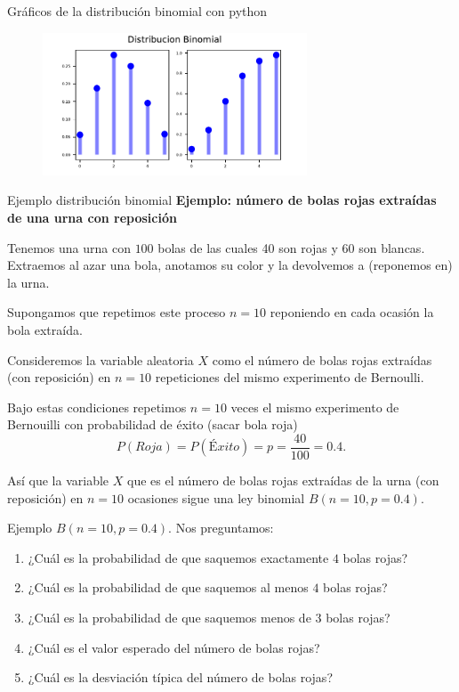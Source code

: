 \documentclass[
  ignorenonframetext,
  aspectratio=169]{beamer}
\providecommand{\tightlist}{%
  \setlength{\itemsep}{0pt}\setlength{\parskip}{0pt}}\usepackage{longtable,booktabs,array}
\begin{document}
\begin{frame}{Gráficos de la distribución binomial con python}
\protect\hypertarget{gruxe1ficos-de-la-distribuciuxf3n-binomial-con-python-2}{}
\begin{figure}

{\centering \includegraphics[width=0.7\textwidth,height=\textheight]{Tema_3_1_Notables_files/figure-beamer/dibu_python2-1.pdf}

}

\end{figure}
\end{frame}

\begin{frame}{Ejemplo distribución binomial}
\protect\hypertarget{ejemplo-distribuciuxf3n-binomial}{}
\textbf{Ejemplo: número de bolas rojas extraídas de una urna con
reposición}

Tenemos una urna con \(100\) bolas de las cuales 40 son rojas y 60 son
blancas. Extraemos al azar una bola, anotamos su color y la devolvemos a
(reponemos en) la urna.

Supongamos que repetimos este proceso \(n=10\) reponiendo en cada
ocasión la bola extraída.

Consideremos la variable aleatoria \(X\) como el número de bolas rojas
extraídas (con reposición) en \(n=10\) repeticiones del mismo
experimento de Bernoulli.

Bajo estas condiciones repetimos \(n=10\) veces el mismo experimento de
Bernouilli con probabilidad de éxito (sacar bola roja)
\[P(Roja)=P(Éxito)=p=\frac{40}{100}=0.4.\]

Así que la variable \(X\) que es el número de bolas rojas extraídas de
la urna (con reposición) en \(n=10\) ocasiones sigue una ley binomial
\(B(n=10,p=0.4).\)
\end{frame}

\begin{frame}{Ejemplo \(B(n=10,p=0.4).\)}
\protect\hypertarget{ejemplo-bn10p0.4.}{}
Nos preguntamos:

\begin{enumerate}
\tightlist
\item
  ¿Cuál es la probabilidad de que saquemos exactamente \(4\) bolas
  rojas?
\item
  ¿Cuál es la probabilidad de que saquemos al menos \(4\) bolas rojas?
\item
  ¿Cuál es la probabilidad de que saquemos menos de \(3\) bolas rojas?
\item
  ¿Cuál es el valor esperado del número de bolas rojas?
\item
  ¿Cuál es la desviación típica del número de bolas rojas?
\end{enumerate}
\end{frame}
\end{document}
